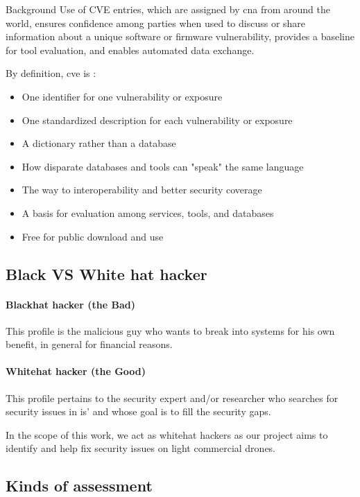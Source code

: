 \begin{chaptercover}{Background}
Use of CVE entries, which are assigned by \acrfull{cna} from around the world, ensures confidence among parties when used to discuss or share information about a unique software or firmware vulnerability, provides a baseline for tool evaluation, and enables automated data exchange.

By definition, \acrshort{cve} is :
\begin{itemize}[itemsep=0.1cm,topsep=0.1cm]
  \item One identifier for one vulnerability or exposure
  \item One standardized description for each vulnerability or exposure
  \item A dictionary rather than a database
  \item How disparate databases and tools can "speak" the same language
  \item The way to interoperability and better security coverage
  \item A basis for evaluation among services, tools, and databases
  \item Free for public download and use
\end{itemize}

\subsection{Black VS White hat hacker}

\paragraph{Blackhat hacker (the {\color{venetianred} Bad})} This profile is the malicious guy who wants to break into systems for his own benefit, in general for financial reasons.

\paragraph{Whitehat hacker (the {\color{forestgreen(web)} Good})} This profile pertains to the security expert and/or researcher who searches for security issues in \acrshort{is}' and whose goal is to fill the security gaps.

\begin{info}
In the scope of this work, we act as whitehat hackers as our project aims to identify and help fix security issues on light commercial drones.
\end{info}

\subsection{Kinds of assessment}


\end{chaptercover}
